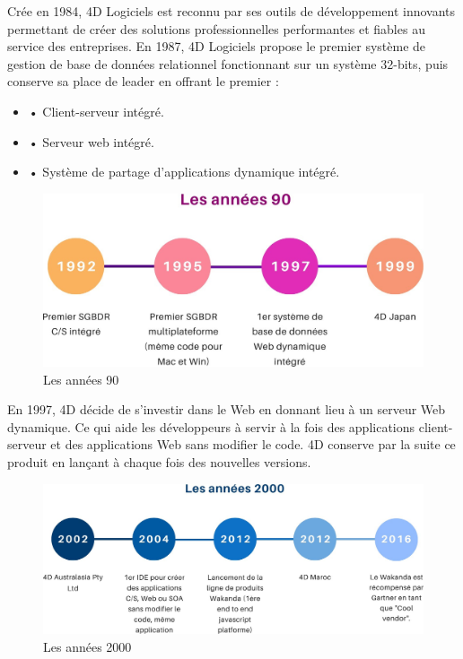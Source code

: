 Crée en 1984, 4D Logiciels est reconnu par ses outils de développement innovants permettant de créer des solutions professionnelles performantes et fiables au service des entreprises.
En 1987, 4D Logiciels propose le premier système de gestion de base de données relationnel fonctionnant sur un système 32-bits, puis conserve sa place de leader en offrant le premier :
\begin{itemize}
    \item • Client-serveur intégré.
    \item • Serveur web intégré.
    \item • Système de partage d’applications dynamique intégré.
\end{itemize}
\vspace{1cm}

\begin{figure}[h]
    \centering
    \includegraphics[scale=0.3]{Images/90.jpg} %
    \caption{Les années 90}
    \label{fig:Histoire90}
\end{figure}

En 1997, 4D décide de s’investir dans le Web en donnant lieu 
à un serveur Web dynamique. Ce qui aide les développeurs à servir
à la fois des applications client-serveur et des applications
Web sans modifier le code. 4D conserve par la suite ce produit 
en lançant à chaque fois des nouvelles versions.
\vspace{6cm}

\begin{figure}[h]
    \centering
    \includegraphics[scale=0.3]{Images/20.jpg} %
    \caption{Les années 2000}
    \label{fig:Histoire90}
\end{figure}

